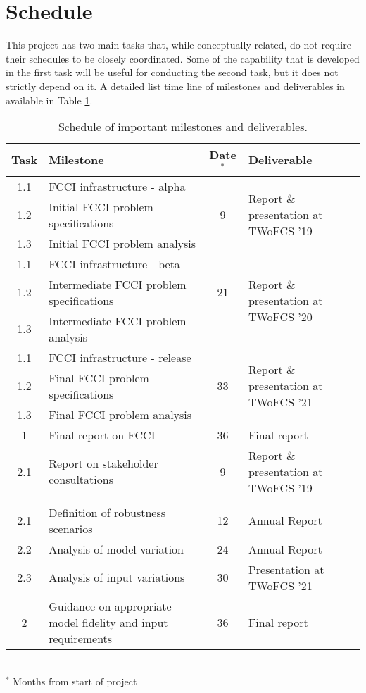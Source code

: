 \section{Schedule}

This project has two main tasks that, while conceptually related, do not
require their schedules to be closely coordinated.  Some of the capability
that is developed in the first task will be useful for conducting the second
task, but it does not strictly depend on it.  A detailed list time line of
milestones and deliverables in available in Table \ref{tab:schedule}.

\begin{table}[!bp]
  \begin{center}
    \caption{Schedule of important milestones and deliverables.}\label{tab:schedule}
    \begin{tabular}{|c|p{}|c|p{}|}\hline\hline
      \textbf{Task} & \textbf{Milestone} & \textbf{Date$^*$} & \textbf{Deliverable} \\\hline\hline
      1.1 & \gls{FCCI} infrastructure - alpha &   & \multirow{3}{0.3\textwidth}{Report \& presentation at TWoFCS '19} \\
      1.2 & Initial \gls{FCCI} problem specifications & 9 & \\
      1.3 & Initial \gls{FCCI} problem analysis &  & \\\hline
      1.1 & \gls{FCCI} infrastructure - beta &   & \multirow{3}{0.3\textwidth}{Report \& presentation at TWoFCS '20} \\
      1.2 & Intermediate \gls{FCCI} problem specifications & 21 & \\
      1.3 & Intermediate \gls{FCCI} problem analysis &  & \\\hline
      1.1 & \gls{FCCI} infrastructure - release &  & \multirow{3}{0.3\textwidth}{Report \& presentation at TWoFCS '21} \\
      1.2 & Final \gls{FCCI} problem specifications & 33 & \\
      1.3 & Final \gls{FCCI} problem analysis &  & \\\hline
      1 & Final report on \gls{FCCI} & 36 & Final report\\
      \hline\hline
      2.1 & Report on stakeholder consultations & 9 & \multirow{1}{0.3\textwidth}{Report \& presentation at TWoFCS '19} \\
          & & &\\
      2.1 & Definition of robustness scenarios & 12 & Annual Report\\
      2.2 & Analysis of model variation & 24 & Annual Report\\
      2.3 & Analysis of input variations & 30 & Presentation at TWoFCS '21\\\hline
      2 & Guidance on appropriate model fidelity and input requirements & 36 & Final report\\
      \hline\hline
    \end{tabular}\\
    $^*$ Months from start of project
  \end{center}
\end{table}


